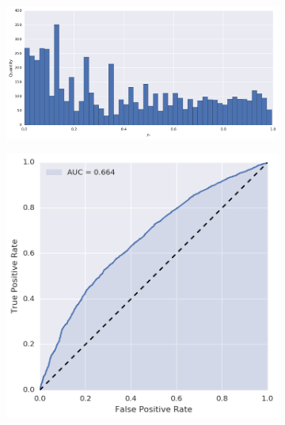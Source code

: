 \begin{figure}[!h]
\centering
\begin{subfigure}[t]{\textwidth}
	\centering
	\includegraphics[height=.175\textheight]{figures/bayes/least1/hist_calls.png}
\end{subfigure}
\begin{subfigure}[b]{.49\textwidth}
	\raggedleft{}
	\includegraphics[height=.175\textheight]{figures/bayes/least1/roc_calls.png}
\end{subfigure}
\begin{subfigure}[b]{.49\textwidth}
	\raggedright{}

\end{subfigure}
\end{figure}
